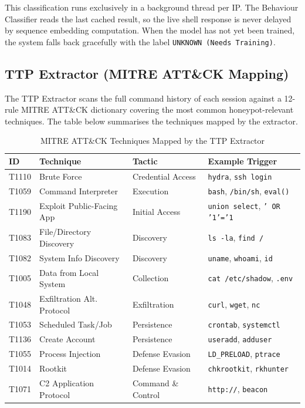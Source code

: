 This classification runs exclusively in a background thread per IP. The Behaviour Classifier reads the last cached result, so the live shell response is never delayed by sequence embedding computation. When the model has not yet been trained, the system falls back gracefully with the label \texttt{UNKNOWN (Needs Training)}.

\subsection{TTP Extractor (MITRE ATT\&CK Mapping)}

The TTP Extractor scans the full command history of each session against a 12-rule MITRE ATT\&CK dictionary covering the most common honeypot-relevant techniques. The table below summarises the techniques mapped by the extractor.

\begin{table}[h!]
    \centering
    \caption{MITRE ATT\&CK Techniques Mapped by the TTP Extractor}
    \renewcommand{\arraystretch}{1.3}
    \begin{tabular}{|l|l|l|l|}
        \hline
        \textbf{ID} & \textbf{Technique} & \textbf{Tactic} & \textbf{Example Trigger} \\
        \hline
        T1110 & Brute Force & Credential Access & \texttt{hydra}, \texttt{ssh login} \\
        T1059 & Command Interpreter & Execution & \texttt{bash}, \texttt{/bin/sh}, \texttt{eval()} \\
        T1190 & Exploit Public-Facing App & Initial Access & \texttt{union select}, \texttt{' OR '1'='1} \\
        T1083 & File/Directory Discovery & Discovery & \texttt{ls -la}, \texttt{find /} \\
        T1082 & System Info Discovery & Discovery & \texttt{uname}, \texttt{whoami}, \texttt{id} \\
        T1005 & Data from Local System & Collection & \texttt{cat /etc/shadow}, \texttt{.env} \\
        T1048 & Exfiltration Alt. Protocol & Exfiltration & \texttt{curl}, \texttt{wget}, \texttt{nc} \\
        T1053 & Scheduled Task/Job & Persistence & \texttt{crontab}, \texttt{systemctl} \\
        T1136 & Create Account & Persistence & \texttt{useradd}, \texttt{adduser} \\
        T1055 & Process Injection & Defense Evasion & \texttt{LD\_PRELOAD}, \texttt{ptrace} \\
        T1014 & Rootkit & Defense Evasion & \texttt{chkrootkit}, \texttt{rkhunter} \\
        T1071 & C2 Application Protocol & Command \& Control & \texttt{http://}, \texttt{beacon} \\
        \hline
    \end{tabular}
\end{table}

